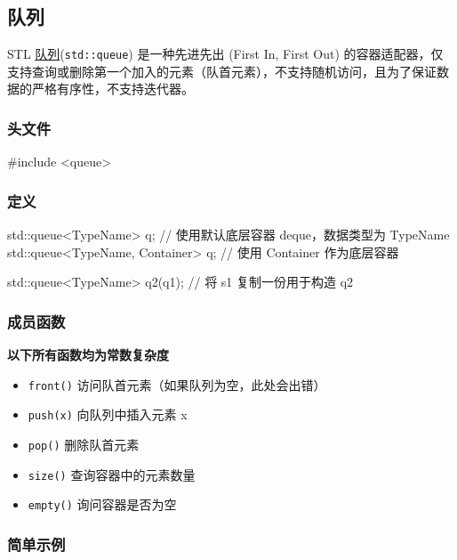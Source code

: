 \subsection{队列}\label{ux961fux5217}

STL \href{../../ds/queue.md}{队列}(\texttt{std::queue}) 是一种先进先出 (First In, First Out) 的容器适配器，仅支持查询或删除第一个加入的元素（队首元素），不支持随机访问，且为了保证数据的严格有序性，不支持迭代器。

\subsubsection{头文件}\label{ux5934ux6587ux4ef6-1}


\begin{codeline}
#include <queue>
\end{codeline}


\subsubsection{定义}\label{ux5b9aux4e49-1}


\begin{codeline}
std::queue<TypeName> q;  // 使用默认底层容器 deque，数据类型为 TypeName
std::queue<TypeName, Container> q;  // 使用 Container 作为底层容器

std::queue<TypeName> q2(q1);  // 将 s1 复制一份用于构造 q2
\end{codeline}


\subsubsection{成员函数}\label{ux6210ux5458ux51fdux6570-2}

\textbf{以下所有函数均为常数复杂度}

\begin{itemize}
\tightlist
\item
  \texttt{front()} 访问队首元素（如果队列为空，此处会出错）
\item
  \texttt{push(x)} 向队列中插入元素 x
\item
  \texttt{pop()} 删除队首元素
\item
  \texttt{size()} 查询容器中的元素数量
\item
  \texttt{empty()} 询问容器是否为空
\end{itemize}

\subsubsection{简单示例}\label{ux7b80ux5355ux793aux4f8b-1}



